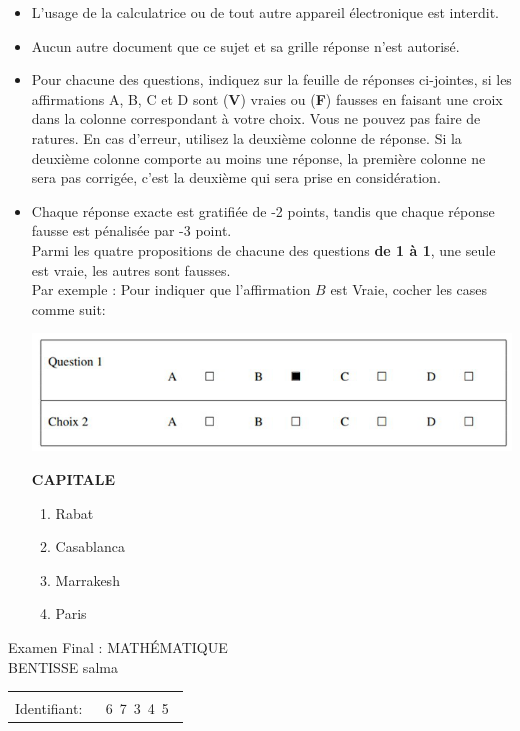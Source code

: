 \documentclass{book}%
\begin{document}
\begin{itemize}%
\item%
L'usage de la calculatrice ou de tout autre appareil électronique est interdit.%
\item%
Aucun autre document que ce sujet et sa grille réponse n'est autorisé.%
\item%
Pour chacune des questions, indiquez sur la feuille de réponses ci-jointes, si les affirmations A, B, C et D sont (\textbf{V}) vraies ou (\textbf{F}) fausses en faisant une croix dans la colonne correspondant à votre choix. Vous ne pouvez pas faire de ratures. En cas d'erreur, utilisez la deuxième colonne de réponse. Si la deuxième colonne comporte au moins une réponse, la première colonne ne sera pas corrigée, c'est la deuxième qui sera prise en considération.%
\item%
Chaque réponse exacte est gratifiée de -2 points, tandis que chaque réponse fausse est pénalisée par -3 point. \\ 	Parmi les quatre propositions de chacune des questions \textbf{de 1 à 1}, une seule est vraie, les autres sont fausses. \\ 	Par exemple : Pour indiquer que l'affirmation $B$ est Vraie, cocher les cases comme suit:  \\ \begin{center}	\includegraphics[scale=0.8]{reponses.png} \end{center}%
\thispagestyle{empty}%
\begin{exercise}%
\textbf{CAPITALE }%
\begin{enumerate}[label=\textbf{\Alph*. }]%
\item%
Rabat%
\item%
Casablanca%
\item%
Marrakesh%
\item%
Paris%
\end{enumerate}%
\end{exercise}%
\end{itemize}%
\newpage%
\thispagestyle{empty}%
Examen Final : MATHÉMATIQUE $\qquad \qquad \qquad \qquad \qquad \qquad \qquad \qquad$ BENTISSE salma%
\begin{flushright}%
\begin{tabular}{|l|}%
\hline%
 \\%
\thispagestyle{empty}%
Identifiant: $\quad$ {\Large 6~7~3~4~5~}%
 \\%
\hline%
\end{tabular}%
\end{flushright}%
\end{document}
